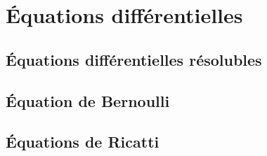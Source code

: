 

					\section{Équations différentielles}

					\subsection{Équations différentielles résolubles}


					\subsection{Équation de Bernoulli}



					\subsection{Équations de Ricatti}



